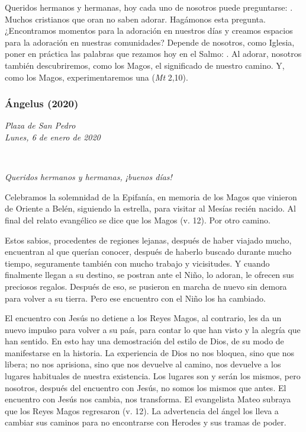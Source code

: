 Queridos hermanos y hermanas, hoy cada uno de nosotros puede preguntarse: . Muchos cristianos que oran no saben adorar. Hagámonos esta pregunta. ¿Encontramos momentos para la adoración en nuestros días y creamos espacios para la adoración en nuestras comunidades? Depende de nosotros, como Iglesia, poner en práctica las palabras que rezamos hoy en el Salmo: . Al adorar, nosotros también descubriremos, como los Magos, el significado de nuestro camino. Y, como los Magos, experimentaremos una  (\emph{Mt} 2,10).



\subsubsection{Ángelus (2020)}

\emph{Plaza de San Pedro\\ Lunes, 6 de enero de 2020}

~

\emph{Queridos hermanos y hermanas, ¡buenos días!}

Celebramos la solemnidad de la Epifanía, en memoria de los Magos que vinieron de Oriente a Belén, siguiendo la estrella, para visitar al Mesías recién nacido. Al final del relato evangélico se dice que los Magos  (v. 12). Por otro camino.

Estos sabios, procedentes de regiones lejanas, después de haber viajado mucho, encuentran al que querían conocer, después de haberlo buscado durante mucho tiempo, seguramente también con mucho trabajo y vicisitudes. Y cuando finalmente llegan a su destino, se postran ante el Niño, lo adoran, le ofrecen sus preciosos regalos. Después de eso, se pusieron en marcha de nuevo sin demora para volver a su tierra. Pero ese encuentro con el Niño los ha cambiado.

El encuentro con Jesús no detiene a los Reyes Magos, al contrario, les da un nuevo impulso para volver a su país, para contar lo que han visto y la alegría que han sentido. En esto hay una demostración del estilo de Dios, de su modo de manifestarse en la historia. La experiencia de Dios no nos bloquea, sino que nos libera; no nos aprisiona, sino que nos devuelve al camino, nos devuelve a los lugares habituales de nuestra existencia. Los lugares son y serán los mismos, pero nosotros, después del encuentro con Jesús, no somos los mismos que antes. El encuentro con Jesús nos cambia, nos transforma. El evangelista Mateo subraya que los Reyes Magos regresaron  (v. 12). La advertencia del ángel los lleva a cambiar sus caminos para no encontrarse con Herodes y sus tramas de poder.

